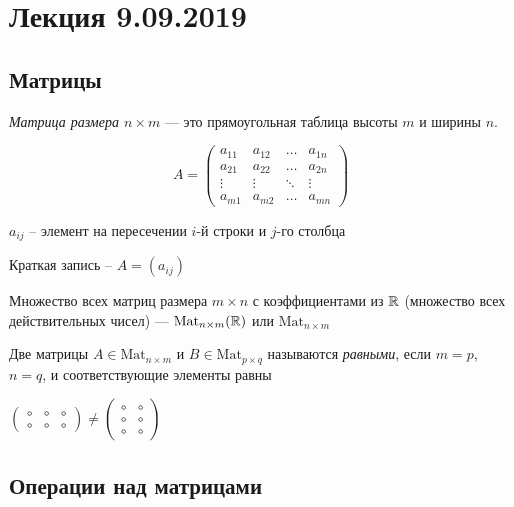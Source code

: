 \section{Лекция 9.09.2019}
\subsection{Матрицы}
\begin{definition}
    \textit{Матрица размера $n \times m$} --- это прямоугольная таблица высоты $m$ и ширины $n$.
\end{definition}

\begin{equation*}
    A = \begin{pmatrix}
        a_{11}  & a_{12} & \dots & a_{1n} \\
        a_{21} & a_{22} & \dots & a_{2n} \\
        \vdots & \vdots & \ddots & \vdots \\
        a_{m1} & a_{m2} & \dots & a_{mn}
    \end{pmatrix}
\end{equation*}

$a_{ij}$ -- элемент на пересечении $i$-й строки и $j$-го столбца

Краткая запись -- $A = (a_{ij})$

Множество всех матриц размера $m \times n$ с коэффициентами из $\mathbb{R}$ (множество всех действительных чисел) --- $\text{Mat}_{n \times m}(\mathbb{R})$ или $\text{Mat}_{n \times m}$

\begin{definition}
    Две матрицы $A \in \text{Mat}_{n \times m}$ и $B \in \text{Mat}_{p \times q}$ называются \textit{равными}, если $m = p$, $n = q$, и соответствующие элементы равны
\end{definition}

\begin{example}
    $\begin{pmatrix}
       \circ & \circ & \circ \\ \circ & \circ & \circ
    \end{pmatrix}
    \neq
    \begin{pmatrix}
        \circ & \circ \\ \circ & \circ \\ \circ & \circ
    \end{pmatrix}$
\end{example}

\subsection{Операции над матрицами}

